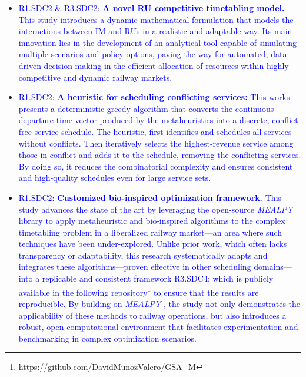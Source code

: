 \documentclass[Afour,sagev,times]{sagej}
\newcommand{\primero}[1]{\textcolor{blue}{#1}}
\newcommand{\tercero}[1]{\textcolor{blue}{#1}}
\begin{document}
\begin{itemize}
  \item \primero{R1.SDC2 \& R3.SDC2: \textbf{A novel \gls{RU} competitive timetabling model.} This study introduces a dynamic mathematical formulation that models the interactions between \gls{IM} and \glspl{RU} in a realistic and adaptable way. Its main innovation lies in the development of an analytical tool capable of simulating multiple scenarios and policy options, paving the way for automated, data-driven decision making in the efficient allocation of resources within highly competitive and dynamic railway markets.}

  \item \primero{R1.SDC2: \textbf{A heuristic for scheduling conflicting services: } This works presents a deterministic greedy algorithm that converts the continuous departure‐time vector produced by the metaheuristics into a discrete, conflict‐free service schedule. The heuristic, first identifies and schedules all services without conflicts. Then iteratively selects the highest‐revenue service among those in conflict and adds it to the schedule, removing the conflicting services. By doing so, it reduces the combinatorial complexity and ensures consistent and high‐quality schedules even for large service sets.}
  

  \item \primero{R1.SDC2: \textbf{Customized bio-inspired optimization framework.} This study advances the state of the art by leveraging the open-source \textit{MEALPY} library to apply metaheuristic and bio-inspired algorithms to the complex timetabling problem in a liberalized railway market—an area where such techniques have been under-explored. Unlike prior work, which often lacks transparency or adaptability, this research systematically adapts and integrates these algorithms—proven effective in other scheduling domains—into a replicable and consistent framework \tercero{R3.SDC4: which is publicly available in the following repository\footnote{\url{https://github.com/DavidMunozValero/GSA_M}} to ensure that the results are reproducible}. By building on \textit{MEALPY} \cite{Vanthieu2023,Vanthieu2023b}, the study not only demonstrates the applicability of these methods to railway operations, but also introduces a robust, open computational environment that facilitates experimentation and benchmarking in complex optimization scenarios.}
  

\end{itemize}
\end{document}
